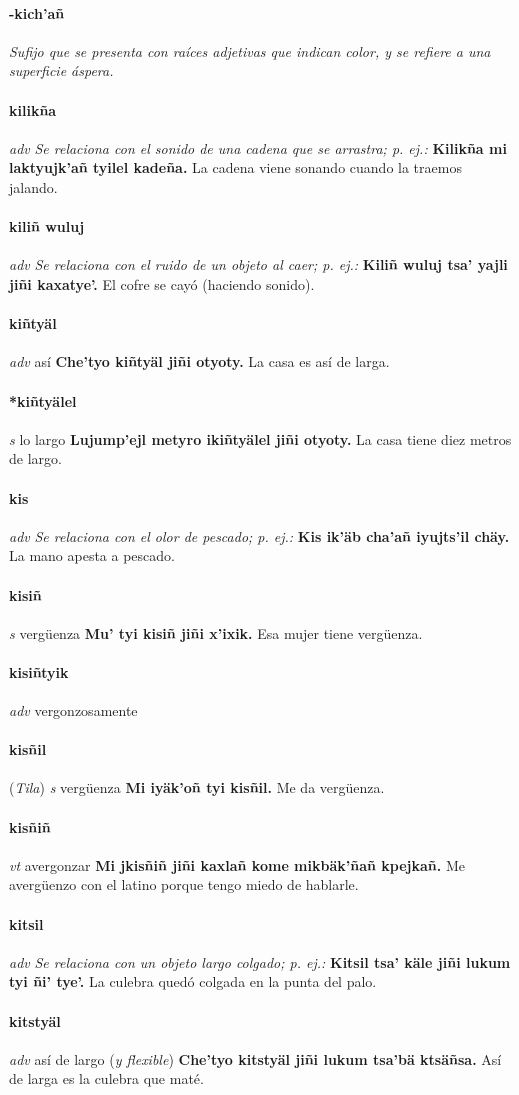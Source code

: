 \documentclass{scrbook}
\newcommand{\entry}[1]{\paragraph{#1}}
\newcommand{\nontranslationdef}[1]{\textit{#1}}
\newcommand{\partofspeech}[1]{\textit{#1}}
\newcommand{\spanishtranslation}[1]{#1}
\newcommand{\clarification}[1]{(\textit{#1})}
\newcommand{\cholexample}[1]{\textbf{#1}}
\newcommand{\exampletranslation}[1]{#1}
\newcommand{\relevantdialect}[1]{(\textit{#1})}
\begin{document}
\begin{multicols}{2}
\entry{-kich'añ}
\nontranslationdef{Sufijo que se presenta con raíces adjetivas que indican color, y se refiere a una superficie áspera.}

\entry{kilikña}
\partofspeech{adv}
\nontranslationdef{Se relaciona con el sonido de una cadena que se arrastra; p. ej.:}
\cholexample{Kilikña mi laktyujk'añ tyilel kadeña.}
\exampletranslation{La cadena viene sonando cuando la traemos jalando.}

\entry{kiliñ wuluj}
\partofspeech{adv}
\nontranslationdef{Se relaciona con el ruido de un objeto al caer; p. ej.:}
\cholexample{Kiliñ wuluj tsa' yajli jiñi kaxatye'.}
\exampletranslation{El cofre se cayó (haciendo sonido).}

\entry{kiñtyäl}
\partofspeech{adv}
\spanishtranslation{así}
\cholexample{Che'tyo kiñtyäl jiñi otyoty.}
\exampletranslation{La casa es así de larga.}

\entry{*kiñtyälel}
\partofspeech{s}
\spanishtranslation{lo largo}
\cholexample{Lujump'ejl metyro ikiñtyälel jiñi otyoty.}
\exampletranslation{La casa tiene diez metros de largo.}

\entry{kis}
\partofspeech{adv}
\nontranslationdef{Se relaciona con el olor de pescado; p. ej.:}
\cholexample{Kis ik'äb cha'añ iyujts'il chäy.}
\exampletranslation{La mano apesta a pescado.}

\entry{kisiñ}
\partofspeech{s}
\spanishtranslation{vergüenza}
\cholexample{Mu' tyi kisiñ jiñi x'ixik.}
\exampletranslation{Esa mujer tiene vergüenza.}

\entry{kisiñtyik}
\partofspeech{adv}
\spanishtranslation{vergonzosamente}

\entry{kisñil}
\relevantdialect{Tila}
\partofspeech{s}
\spanishtranslation{vergüenza}
\cholexample{Mi iyäk'oñ tyi kisñil.}
\exampletranslation{Me da vergüenza.}

\entry{kisñiñ}
\partofspeech{vt}
\spanishtranslation{avergonzar}
\cholexample{Mi jkisñiñ jiñi kaxlañ kome mikbäk'ñañ kpejkañ.}
\exampletranslation{Me avergüenzo con el latino porque tengo miedo de hablarle.}

\entry{kitsil}
\partofspeech{adv}
\nontranslationdef{Se relaciona con un objeto largo colgado; p. ej.:}
\cholexample{Kitsil tsa' käle jiñi lukum tyi ñi' tye'.}
\exampletranslation{La culebra quedó colgada en la punta del palo.}

\entry{kitstyäl}
\partofspeech{adv}
\spanishtranslation{así de largo}
\clarification{y flexible}
\cholexample{Che'tyo kitstyäl jiñi lukum tsa'bä ktsäñsa.}
\exampletranslation{Así de larga es la culebra que maté.}


\end{multicols}
\end{document}
